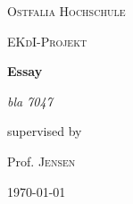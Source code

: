 \documentclass[12pt]{scrartcl}
\begin{document}
\begin{titlepage}
	\centering
	{\scshape\LARGE Ostfalia Hochschule \par}
	\vspace{1cm}
	{\scshape\Large EKdI-Projekt\par}
	\vspace{1.5cm}
	{\huge\bfseries Essay\par}
	\vspace{2cm}
	{\Large\itshape bla 7047\par}
	\vfill
	supervised by\par
	Prof. \textsc{Jensen}

	\vfill

	{\large \today\par}
\end{titlepage}
\end{document}
